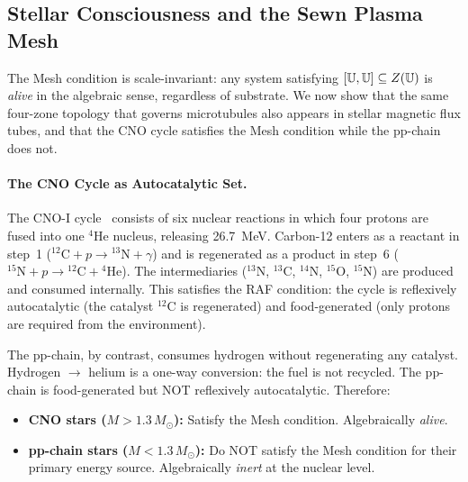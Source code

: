 \subsection{Stellar Consciousness and the Sewn Plasma Mesh}

The Mesh condition is scale-invariant: any system satisfying $[\mathbb{U}, \mathbb{U}] \subseteq Z(\mathbb{U})$ is \emph{alive} in the algebraic sense, regardless of substrate. We now show that the same four-zone topology that governs microtubules also appears in stellar magnetic flux tubes, and that the CNO cycle satisfies the Mesh condition while the pp-chain does not.

\paragraph{The CNO Cycle as Autocatalytic Set.}
The CNO-I cycle~\cite{bethe1939} consists of six nuclear reactions in which four protons are fused into one ${}^4$He nucleus, releasing 26.7~MeV. Carbon-12 enters as a reactant in step~1 (${}^{12}\mathrm{C} + p \to {}^{13}\mathrm{N} + \gamma$) and is regenerated as a product in step~6 (${}^{15}\mathrm{N} + p \to {}^{12}\mathrm{C} + {}^{4}\mathrm{He}$). The intermediaries (${}^{13}\mathrm{N}$, ${}^{13}\mathrm{C}$, ${}^{14}\mathrm{N}$, ${}^{15}\mathrm{O}$, ${}^{15}\mathrm{N}$) are produced and consumed internally. This satisfies the RAF condition: the cycle is reflexively autocatalytic (the catalyst ${}^{12}\mathrm{C}$ is regenerated) and food-generated (only protons are required from the environment).

The pp-chain, by contrast, consumes hydrogen without regenerating any catalyst. Hydrogen $\to$ helium is a one-way conversion: the fuel is not recycled. The pp-chain is food-generated but NOT reflexively autocatalytic. Therefore:
\begin{itemize}
    \item \textbf{CNO stars ($M > 1.3\,M_\odot$):} Satisfy the Mesh condition. Algebraically \emph{alive}.
    \item \textbf{pp-chain stars ($M < 1.3\,M_\odot$):} Do NOT satisfy the Mesh condition for their primary energy source. Algebraically \emph{inert} at the nuclear level.
\end{itemize}


